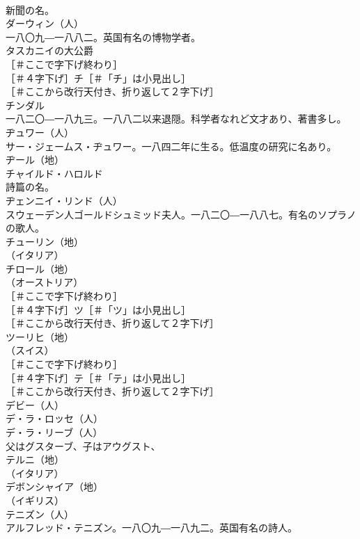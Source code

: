 \documentclass[8pt]{extreport}
\begin{document}
\begin{CJK}{UTF8}{min}
\\	新聞の名。
\\	ダーウィン（人）
\\	一八〇九―一八八二。英国有名の博物学者。
\\	タスカニイの大公爵 
\\	［＃ここで字下げ終わり］
\\	［＃４字下げ］チ［＃「チ」は小見出し］
\\	［＃ここから改行天付き、折り返して２字下げ］
\\	チンダル 
\\	一八二〇―一八九三。一八八二以来退隠。科学者なれど文才あり、著書多し。
\\	ヂュワー（人）
\\	サー・ジェームス・ヂュワー。一八四二年に生る。低温度の研究に名あり。
\\	ヂール（地）
\\	チャイルド・ハロルド 
\\	詩篇の名。
\\	ヂェンニイ・リンド（人）
\\	スウェーデン人ゴールドシュミッド夫人。一八二〇―一八八七。有名のソプラノの歌人。
\\	チューリン（地）
\\	（イタリア）
\\	チロール（地）
\\	（オーストリア）
\\	［＃ここで字下げ終わり］
\\	［＃４字下げ］ツ［＃「ツ」は小見出し］
\\	［＃ここから改行天付き、折り返して２字下げ］
\\	ツーリヒ（地）
\\	（スイス）
\\	［＃ここで字下げ終わり］
\\	［＃４字下げ］テ［＃「テ」は小見出し］
\\	［＃ここから改行天付き、折り返して２字下げ］
\\	デビー（人）
\\	デ・ラ・ロッセ（人）
\\	デ・ラ・リーブ（人）
\\	父はグスターブ、子はアウグスト、
\\	テルニ（地）
\\	（イタリア）
\\	デボンシャイア（地）
\\	（イギリス）
\\	テニズン（人）
\\	アルフレッド・テニズン。一八〇九―一八九二。英国有名の詩人。

\end{CJK}
\end{document}
